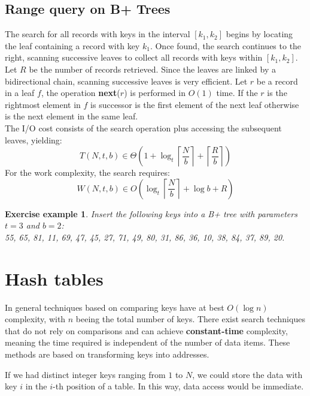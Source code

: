 \documentclass{report}
\newtheorem{es}{Exercise example}[chapter]
\begin{document}
\section{Range query on B+ Trees}
The search for all records with keys in the interval \([k_1, k_2]\) begins by locating the leaf containing a record with key \( k_1 \).
Once found, the search continues to the right, scanning successive leaves to collect all records with keys within \([k_1, k_2]\). Let \( R \) be the number of records retrieved.  
Since the leaves are linked by a bidirectional chain, scanning successive leaves is very efficient. Let \(r\) be a record in a leaf \(f\), the operation \textbf{next}(\(r\)) is performed in \(O(1)\) time. If the \(r\) is the rightmost element in \(f\) is successor is the first element of the next leaf otherwise is the next element in the same leaf.\\
The I/O cost consists of the search operation plus accessing the subsequent leaves, yielding: \\  
\begin{equation}
T(N,t,b) \in \Theta \left( 1 + \log_t \left\lceil \frac{N}{b} \right\rceil + \left\lceil \frac{R}{b} \right\rceil \right)  
\end{equation}
For the work complexity, the search requires: \\  
\begin{equation}  
W(N,t,b) \in O \left( \log_t \left\lceil \frac{N}{b} \right\rceil + \log b + R \right)  
\end{equation}
\begin{es}
    Insert the following keys into a B+ tree with parameters \( t=3 \) and \( b=2 \):  
    \\55, 65, 81, 11, 69, 47, 45, 27, 71, 49, 80, 31, 86, 36, 10, 38, 84, 37, 89, 20.
\end{es}

\chapter{Hash tables}
In general techniques based on comparing keys have at best \(O(\log n)\) complexity, with \(n\) beeing the total number of keys. There exist search techniques that do not rely on comparisons and can achieve \textbf{constant-time} complexity, meaning the time required is independent of the number of data items. These methods are based on transforming keys into addresses. 

If we had distinct integer keys ranging from $1$ to $N$, we could store the data with key $i$ in the $i$-th position of a table. In this way, data access would be immediate.
\end{document}
